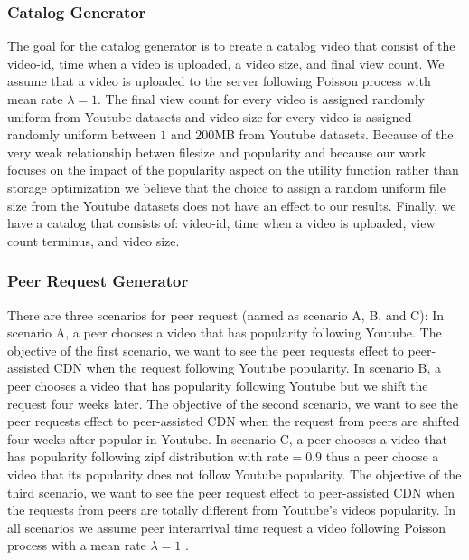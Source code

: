\documentclass[10pt,final,journal,a4paper]{IEEEtran}
\begin{document}
\subsubsection{Catalog Generator}\label{catalog}
The goal for the catalog generator is to create a catalog video that consist of the video-id, time when a video is uploaded, a video size, and final view count.
We assume that a video is uploaded to the server following Poisson process with mean rate $\lambda=1$. 
The final view count for every video is assigned randomly uniform from Youtube datasets and video size for every video is assigned randomly uniform between $1$ and $200$MB from Youtube datasets. 
Because of the very weak relationship betwen filesize and popularity \cite{abhari2010workload} and because our work focuses on the impact of the popularity aspect on the utility function rather than storage optimization we believe that the choice to assign a random uniform file size from the Youtube datasets does not have an effect to our results.
Finally, we have a catalog that consists of: video-id, time when a video is uploaded, view count terminus, and video size.

\subsubsection{Peer Request Generator}\label{peerrequest}
There are three scenarios for peer request (named as scenario A, B, and C):
In scenario A, a peer chooses a video that has popularity following Youtube.
The objective of the first scenario, we want to see the peer requests effect to peer-assisted CDN when the request following Youtube popularity. 
In scenario B, a peer chooses a video that has popularity following Youtube but we shift the request four weeks later.  
The objective of the second scenario, we want to see the peer requests effect to peer-assisted CDN when the request from peers are shifted four weeks after popular in Youtube.
In scenario C, a peer chooses a video that has popularity following zipf distribution with rate$=0.9$ \cite{6654887} thus a peer choose a video that its popularity does not follow Youtube popularity.
The objective of the third scenario, we want to see the peer request effect to peer-assisted CDN when the requests from peers are totally different from Youtube's videos popularity.
In all scenarios we assume peer interarrival time request a video following Poisson process with a mean rate $\lambda=1$ \cite{Zink:2009:CYN:1502814.1502987}.
\end{document}
